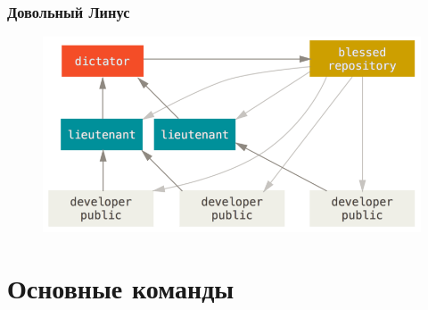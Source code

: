 \documentclass[pdf,russian]{beamer}
\begin{document}
\begin{frame}
    \frametitle{Довольный Линус}
    \begin{figure}
        \includegraphics[width=\textwidth]{dictator}
    \end{figure}
\end{frame}

\section{Основные команды}
\end{document}
